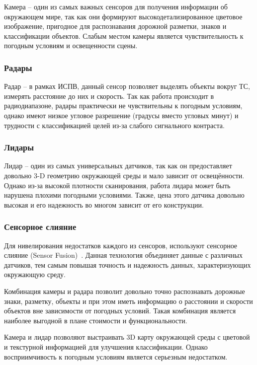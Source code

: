 Камера -- один из самых важных сенсоров для получения информации об окружающем мире, так как они формируют высокодетализированное цветовое изображение, пригодное для распознавания дорожной разметки, знаков и классификации объектов. Слабым местом камеры является чувствительность к погодным условиям и освещенности сцены.
 
\subsubsection{Радары}

Радар -- в рамках ИСПВ, данный сенсор позволяет выделять объекты вокруг ТС, измерять расстояние до них и скорость. Так как работа происходит в радиодиапазоне, радары практически не чувствительны к погодным условиям, однако имеют низкое угловое разрешение (градусы вместо угловых минут) и трудности с классификацией целей из-за слабого сигнального контраста.

\subsubsection{Лидары}

Лидар -- один из самых универсальных датчиков, так как он предоставляет довольно 3-D геометрию окружающей среды и мало зависит от освещённости. Однако из-за высокой плотности сканирования, работа лидара может быть нарушена плохими погодными условиями. Также, цена этого датчика довольно высокая и его надежность во многом зависит от его конструкции. 
 
\subsubsection{Сенсорное слияние}
Для нивелирования недостатков каждого из сенсоров, используют сенсорное слияние (Sensor Fusion)~\cite{Liu2024}. Данная технология объединяет данные с различных датчиков, тем самым повышая точность и надежность данных, характеризующих окружающую среду. 

Комбинация камеры и радара позволит довольно точно распознавать дорожные знаки, разметку, объекты и при этом иметь информацию о расстоянии и скорости объектов вне зависимости от погодных условий. Такая комбинация является наиболее выгодной в плане стоимости и функциональности. 

Камера и лидар позволяют выстраивать 3D карту окружающей среды с цветовой и текстурной информацией для улучшения классификации. Однако восприимчивость к погодным условиям является серьезным недостатком. 

